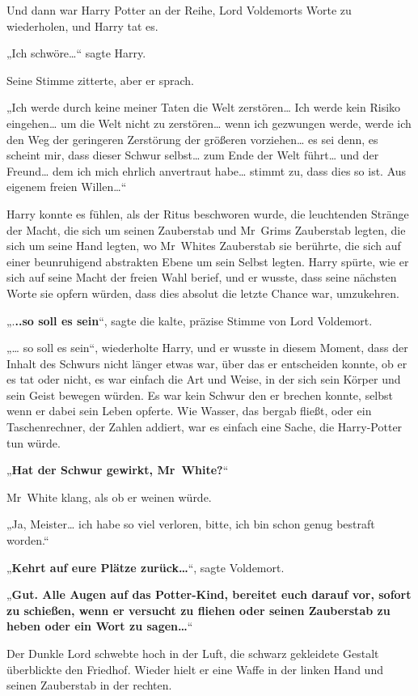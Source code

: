 {Und dann war Harry Potter an der Reihe, Lord Voldemorts Worte zu wiederholen, und Harry tat es.

„Ich schwöre…“ sagte Harry.

Seine Stimme zitterte, aber er sprach.

„Ich werde durch keine meiner Taten die Welt zerstören… Ich werde kein Risiko eingehen… um die Welt nicht zu zerstören… wenn ich gezwungen werde, werde ich den Weg der geringeren Zerstörung der größeren vorziehen… es sei denn, es scheint mir, dass dieser Schwur selbst… zum Ende der Welt führt… und der Freund… dem ich mich ehrlich anvertraut habe… stimmt zu, dass dies so ist. Aus eigenem freien Willen…“

Harry konnte es fühlen, als der Ritus beschworen wurde, die leuchtenden Stränge der Macht, die sich um seinen Zauberstab und Mr~Grims Zauberstab legten, die sich um seine Hand legten, wo Mr~Whites Zauberstab sie berührte, die sich auf einer beunruhigend abstrakten Ebene um sein Selbst legten. Harry spürte, wie er sich auf seine Macht der freien Wahl berief, und er wusste, dass seine nächsten Worte sie opfern würden, dass dies absolut die letzte Chance war, umzukehren.

„.\textbf{..so soll es sein}“, sagte die kalte, präzise Stimme von Lord Voldemort.

„… so soll es sein“, wiederholte Harry, und er wusste in diesem Moment, dass der Inhalt des Schwurs nicht länger etwas war, über das er entscheiden konnte, ob er es tat oder nicht, es war einfach die Art und Weise, in der sich sein Körper und sein Geist bewegen würden. Es war kein Schwur den er brechen konnte, selbst wenn er dabei sein Leben opferte. Wie Wasser, das bergab fließt, oder ein Taschenrechner, der Zahlen addiert, war es einfach eine Sache, die Harry-Potter tun würde.

„\textbf{Hat der Schwur gewirkt, Mr~White?}“

Mr~White klang, als ob er weinen würde.

„Ja, Meister… ich habe so viel verloren, bitte, ich bin schon genug bestraft worden.“

„\textbf{Kehrt auf eure Plätze zurück…}“, sagte Voldemort.

„\textbf{Gut. Alle Augen auf das Potter-Kind, bereitet euch darauf vor, sofort zu schießen, wenn er versucht zu fliehen oder seinen Zauberstab zu heben oder ein Wort zu sagen…}“

Der Dunkle Lord schwebte hoch in der Luft, die schwarz gekleidete Gestalt überblickte den Friedhof. Wieder hielt er eine Waffe in der linken Hand und seinen Zauberstab in der rechten.

}
